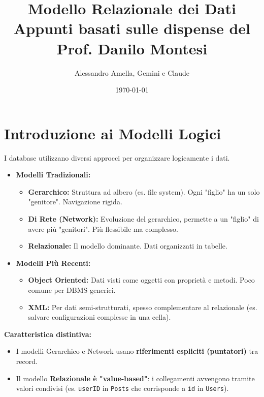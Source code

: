 

\usepackage{hyperref}

\title{Modello Relazionale dei Dati\\
  \large Appunti basati sulle dispense del Prof. Danilo Montesi}
\author{Alessandro Amella, Gemini e Claude}
\date{\today}


	
	\maketitle
	\tableofcontents
	\newpage
	
	\section{Introduzione ai Modelli Logici}
	I database utilizzano diversi approcci per organizzare logicamente i dati.
	\begin{itemize}
		\item \textbf{Modelli Tradizionali:}
		\begin{itemize}
			\item \textbf{Gerarchico:} Struttura ad albero (es. file system). Ogni "figlio" ha un solo "genitore". Navigazione rigida.
			\item \textbf{Di Rete (Network):} Evoluzione del gerarchico, permette a un "figlio" di avere più "genitori". Più flessibile ma complesso.
			\item \textbf{Relazionale:} Il modello dominante. Dati organizzati in tabelle.
		\end{itemize}
		\item \textbf{Modelli Più Recenti:}
		\begin{itemize}
			\item \textbf{Object Oriented:} Dati visti come oggetti con proprietà e metodi. Poco comune per DBMS generici.
			\item \textbf{XML:} Per dati semi-strutturati, spesso complementare al relazionale (es. salvare configurazioni complesse in una cella).
		\end{itemize}
	\end{itemize}
	
	\textbf{Caratteristica distintiva:}
	\begin{itemize}
		\item I modelli Gerarchico e Network usano \textbf{riferimenti espliciti (puntatori)} tra record.
		\item Il modello \textbf{Relazionale è "value-based"}: i collegamenti avvengono tramite valori condivisi (es. \texttt{userID} in \texttt{Posts} che corrisponde a \texttt{id} in \texttt{Users}).
	\end{itemize}
	
